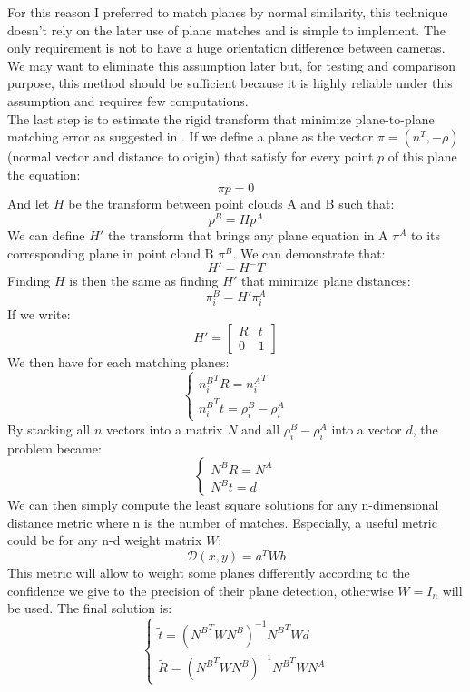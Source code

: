 For this reason I preferred to match planes by normal similarity, this technique doesn't rely on the later use of plane matches and is simple to implement. The only requirement is not to have a huge orientation difference between cameras. We may want to eliminate this assumption later but, for testing and comparison purpose, this method should be sufficient because it is highly reliable under this assumption and requires few computations. \\
The last step is to estimate the rigid transform that minimize plane-to-plane matching error as suggested in \cite{khoshelham2016}. 
\newline
If we define a plane as the vector $\pi=(n^T, -\rho)$ (normal vector and distance to origin) that satisfy for every point $p$ of this plane the equation:
\[\pi p=0\]
And let $H$ be the transform between point clouds A and B such that:
\[p^B = Hp^A\]
We can define $H'$ the transform that brings any plane equation in A $\pi^A$ to its corresponding plane in point cloud B $\pi^{B}$. We can demonstrate that: \[H'=H^-T\]
Finding $H$ is then the same as finding $H'$ that minimize plane distances: \[\pi^B_i=H'\pi^A_i\]
If we write:
\[H'=\begin{bmatrix}
R & t\\ 
0 & 1
\end{bmatrix}\]
We then have for each matching planes:
\[\left\{\begin{matrix}
{n_i^B}^TR={n_i^A}^T\\ 
{n_i^B}^Tt=\rho_i^B-\rho_i^A
\end{matrix}\right.\]
By stacking all $n$ vectors into a matrix $N$ and all $\rho_i^B-\rho_i^A$ into a vector $d$, the problem became:
\[\left\{\begin{matrix}
N^BR=N^A\\ 
N^Bt=d
\end{matrix}\right.\]
We can then simply compute the least square solutions for any n-dimensional distance metric where n is the number of matches. Especially, a useful metric could be for any n-d weight matrix $W$:
\[\mathcal{D}(x,y)=a^TWb\]
This metric will allow to weight some planes differently according to the confidence we give to the precision of their plane detection, otherwise $W=I_n$ will be used.
The final solution is:
\[\left\{\begin{matrix}
\tilde{t}=({N^B}^TWN^B)^{-1}{N^B}^TWd\\ 
\tilde{R}=({N^B}^TWN^B)^{-1}{N^B}^TWN^A
\end{matrix}\right.\]

